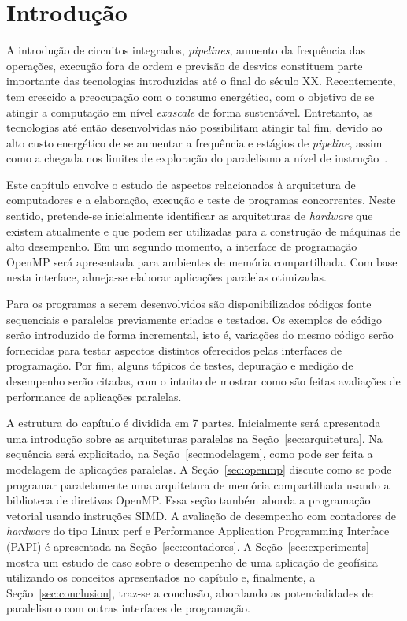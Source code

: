 \section{Introdução}

A introdução de circuitos integrados, \textit{pipelines}, aumento da frequência das operações, execução fora de ordem e previsão de desvios constituem parte importante das tecnologias introduzidas até o final do século XX. Recentemente, tem crescido a preocupação com o consumo energético, com o objetivo de se atingir a computação em nível \textit{exascale} de forma sustentável. Entretanto, as tecnologias até então desenvolvidas não possibilitam atingir tal fim, devido ao alto custo energético de se aumentar a frequência e estágios de \textit{pipeline}, assim como a chegada nos limites de exploração do paralelismo a nível de instrução~\cite{borkar2011future,coteus2011technologies}. 

Este capítulo envolve o estudo de aspectos relacionados à arquitetura de computadores e a elaboração, execução e teste de programas concorrentes. Neste sentido, pretende-se inicialmente identificar as arquiteturas de \textit{hardware} que existem atualmente e que podem ser utilizadas para a construção de máquinas de alto desempenho. Em um segundo momento, a interface de programação OpenMP será apresentada para ambientes de memória compartilhada. Com base nesta interface, almeja-se elaborar aplicações paralelas otimizadas. 

Para os programas a serem desenvolvidos são disponibilizados códigos fonte sequenciais e paralelos previamente criados e testados.  Os exemplos de código serão introduzido de forma incremental, isto é, variações do mesmo código serão fornecidas para testar aspectos distintos oferecidos pelas interfaces de programação. Por fim, alguns tópicos de testes, depuração e medição de desempenho serão citadas, com o intuito de mostrar como são feitas avaliações de performance de aplicações paralelas.

A estrutura do capítulo é dividida em 7 partes. Inicialmente será apresentada uma introdução sobre as arquiteturas paralelas na Seção~\ref{sec:arquitetura}. Na sequência será explicitado, na Seção~\ref{sec:modelagem}, como pode ser feita a modelagem de aplicações paralelas. A Seção~\ref{sec:openmp} discute como se pode programar paralelamente uma arquitetura de memória compartilhada usando a biblioteca de diretivas OpenMP. Essa seção também aborda a programação vetorial usando instruções SIMD. A avaliação de desempenho com contadores de \textit{hardware} do tipo Linux perf e Performance Application Programming Interface (PAPI) é apresentada na Seção~\ref{sec:contadores}. 
A Seção~\ref{sec:experiments} mostra um estudo de caso sobre o desempenho de uma aplicação de geofísica utilizando os conceitos apresentados no capítulo e, finalmente, a Seção~\ref{sec:conclusion}, traz-se a conclusão, abordando as potencialidades de paralelismo com outras interfaces de programação.